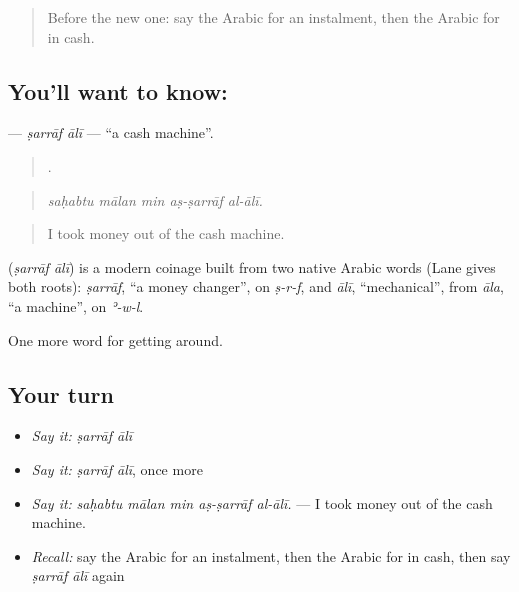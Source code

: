 \label{lesson:AR-C453-sarraf-ali}



\begin{quote}
Before the new one: say the Arabic for an instalment, then the Arabic for in cash.
\end{quote}

\subsection*{You'll want to know:  }
\textbf{ } — \emph{ṣarrāf ālī} — \textquotedblleft{}a cash machine\textquotedblright{}.

\begin{quote}
    .
\end{quote}

\begin{quote}
\emph{saḥabtu mālan min aṣ-ṣarrāf al-ālī.}
\end{quote}

\begin{quote}
I took money out of the cash machine.
\end{quote}

\begin{cousinweb}
\textbf{ } (\emph{ṣarrāf ālī}) is a modern coinage built from two native Arabic words (Lane gives both roots): \emph{ṣarrāf}, \textquotedblleft{}a money changer\textquotedblright{}, on \emph{ṣ-r-f}, and \emph{ālī}, \textquotedblleft{}mechanical\textquotedblright{}, from \emph{āla}, \textquotedblleft{}a machine\textquotedblright{}, on \emph{ʾ-w-l}.
\end{cousinweb}

\begin{grammarlens}[title={What you've built}]
One more word for getting around.
\end{grammarlens}

\subsection*{Your turn}
\begin{itemize}
\raggedright
  \item \emph{Say it:} \emph{ṣarrāf ālī}
  \item \emph{Say it:} \emph{ṣarrāf ālī}, once more
  \item \emph{Say it:} \emph{saḥabtu mālan min aṣ-ṣarrāf al-ālī.} — I took money out of the cash machine.
  \item \emph{Recall:} say the Arabic for an instalment, then the Arabic for in cash, then say \emph{ṣarrāf ālī} again
\end{itemize}

